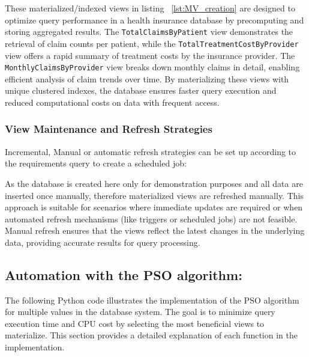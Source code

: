 These materialized/indexed views in listing ~\ref{lst:MV_creation} are designed to optimize query performance in a health insurance database by precomputing and storing aggregated results. The \texttt{TotalClaimsByPatient} view demonstrates the retrieval of claim counts per patient, while the \texttt{TotalTreatmentCostByProvider} view offers a rapid summary of treatment costs by the insurance provider. The \texttt{MonthlyClaimsByProvider} view breaks down monthly claims in detail, enabling efficient analysis of claim trends over time. By materializing these views with unique clustered indexes, the database ensures faster query execution and reduced computational costs on data with frequent access.



  \subsubsection{View Maintenance and Refresh Strategies}\label{View_maintainance} Incremental, Manual or automatic refresh strategies can be set up according to the requirements query to create a scheduled job:\vspace{.4cm}

\vspace{.4cm}

As the database is created here only for demonstration purposes and all data are inserted once manually, therefore materialized views are refreshed manually. This approach is suitable for scenarios where immediate updates are required or when automated refresh mechanisms (like triggers or scheduled jobs) are not feasible. Manual refresh ensures that the views reflect the latest changes in the underlying data, providing accurate results for query processing.\vspace{.4cm}

\subsection{Automation with the PSO algorithm:} \label{Cost_evaluation}
 The following Python code illustrates the implementation of the PSO algorithm for multiple values in the database system. The goal is to minimize query execution time and CPU cost by selecting the most beneficial views to materialize. This section provides a detailed explanation of each function in the implementation.




